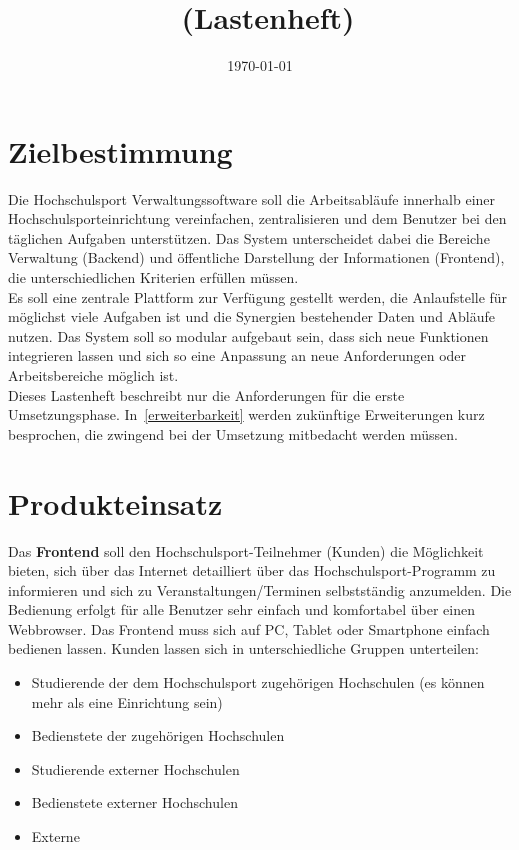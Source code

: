 \documentclass[a4paper,11pt]{article}
\title{\projektName~(Lastenheft)}
\author{\authorName}
\date{\today}
\begin{document}
 \setcounter{page}{2}
 \tableofcontents          %
 \clearpage
 
\section{Zielbestimmung}
Die Hochschulsport Verwaltungssoftware soll die Arbeitsabläufe innerhalb einer Hochschulsporteinrichtung vereinfachen, zentralisieren und dem Benutzer bei den täglichen Aufgaben unterstützen. Das System unterscheidet dabei die Bereiche Verwaltung (Backend) und öffentliche Darstellung der Informationen (Frontend), die unterschiedlichen Kriterien erfüllen müssen. \\
Es soll eine zentrale Plattform zur Verfügung gestellt werden, die Anlaufstelle für möglichst viele Aufgaben ist und die Synergien bestehender Daten und Abläufe nutzen. Das System soll so modular aufgebaut sein, dass sich neue Funktionen integrieren lassen und sich so eine Anpassung an neue Anforderungen oder Arbeitsbereiche möglich ist.\\
Dieses Lastenheft beschreibt nur die Anforderungen für die erste Umsetzungsphase. In~\ref{erweiterbarkeit} werden zukünftige Erweiterungen kurz besprochen, die zwingend bei der Umsetzung mitbedacht werden müssen.



\section{Produkteinsatz}
Das \textbf{Frontend} soll den Hochschulsport-Teilnehmer (Kunden) die Möglichkeit bieten, sich über das Internet detailliert über das Hochschulsport-Programm zu informieren und sich zu Veranstaltungen/Terminen selbstständig anzumelden. Die Bedienung erfolgt für alle Benutzer sehr einfach und komfortabel über einen Webbrowser. Das Frontend muss sich auf PC, Tablet oder Smartphone einfach bedienen lassen.
Kunden lassen sich in unterschiedliche Gruppen unterteilen:
\begin{itemize}
\item Studierende der dem Hochschulsport zugehörigen Hochschulen (es können mehr als eine Einrichtung sein)
\item Bedienstete der zugehörigen Hochschulen
\item Studierende externer Hochschulen
\item Bedienstete externer Hochschulen
\item Externe
\end{itemize} 
\end{document}
